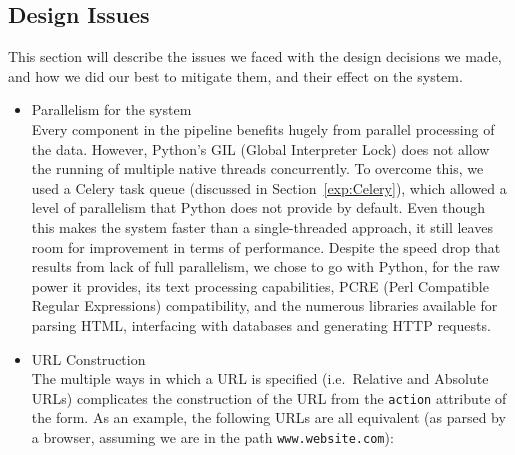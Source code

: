 \subsection[Issues]{Design Issues}
\label{sys:issues}
This section will describe the issues we faced with the design decisions we made, and how we did our best to mitigate them, and their effect on the system.

\begin{itemize}

	\item Parallelism for the system\\
	\label{issues:parallel}
	Every component in the pipeline benefits hugely from parallel processing of the data. However, Python's GIL (Global Interpreter Lock) does not allow the running of multiple native threads concurrently. To overcome this, we used a Celery task queue (discussed in Section~\ref{exp:Celery}), which allowed a level of parallelism that Python does not provide by default. Even though this makes the system faster than a single-threaded approach, it still leaves room for improvement in terms of performance. Despite the speed drop that results from lack of full parallelism, we chose to go with Python, for the raw power it provides, its text processing capabilities, PCRE (Perl Compatible Regular Expressions) compatibility, and the numerous libraries available for parsing HTML, interfacing with databases and generating HTTP requests.

	\item URL Construction\\
	The multiple ways in which a URL is specified (i.e.\ Relative and Absolute URLs) complicates the construction of the URL from the \texttt{action} attribute of the form.  As an example, the following URLs are all equivalent (as parsed by a browser, assuming we are in the path \texttt{www.website.com}):


\end{itemize}
